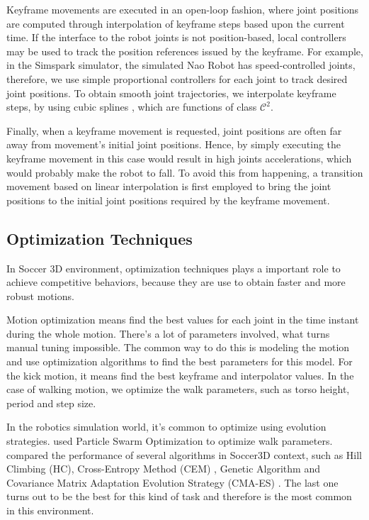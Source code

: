 Keyframe movements are executed in an open-loop fashion, where joint positions are computed through interpolation of keyframe steps based upon the current time. If the interface to the robot joints is not position-based, local controllers may be used to track the position references issued by the keyframe. For example, in the Simspark simulator, the simulated Nao Robot has speed-controlled joints, therefore, we use simple proportional controllers for each joint to track desired joint positions. To obtain smooth joint trajectories, we interpolate keyframe steps, by using cubic splines \cite{bartels1987}, which are functions of class \( \mathcal{C}^2 \). 

Finally, when a keyframe movement is requested, joint positions are often far away from movement's initial joint positions. Hence, by simply executing the keyframe movement in this case would result in high joints accelerations, which would probably make the robot to fall. To avoid this from happening, a transition movement based on linear interpolation is first employed to bring the joint positions to the initial joint positions required by the keyframe movement.

\subsection{Optimization Techniques}

In Soccer 3D environment, optimization techniques plays a important role to achieve competitive behaviors, because they are use to obtain faster and more robust motions.

Motion optimization means find the best values for each joint in the time instant during the whole motion. There's a lot of parameters involved, what turns manual tuning impossible. The common way to do this is modeling the motion and use optimization algorithms to find the best parameters for this model. For the kick motion, it means find the best keyframe and interpolator values. In the case of walking motion, we optimize the walk parameters, such as torso height, period and step size.

In the robotics simulation world, it's common to optimize using evolution strategies. \cite{tgmmaximo} used Particle Swarm Optimization to optimize walk parameters. \cite{AAMAS11-urieli} compared the performance of several algorithms in Soccer3D context, such as Hill Climbing (HC), Cross-Entropy Method (CEM) \cite{crossentropy}, Genetic Algorithm and Covariance Matrix Adaptation Evolution Strategy (CMA-ES) \cite{cmaes}. The last one turns out to be the best for this kind of task and therefore is the most common in this environment. 

